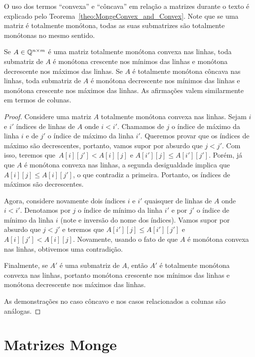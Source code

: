 O uso dos termos ``convexa'' e ``côncava'' em relação a matrizes durante o texto é explicado pelo Teorema~\ref{theo:MongeConvex_and_Convex}. Note que se uma matriz é totalmente monótona, todas as suas submatrizes são totalmente monótonas no mesmo sentido.

\begin{lema} \label{lema:MonotoneTotallyMonotone}
Se $A \in \mathbb{Q}^{n \times m}$ é uma matriz totalmente monótona convexa nas linhas, toda submatriz de $A$ é monótona crescente nos mínimos das linhas e monótona decrescente nos máximos das linhas. Se $A$ é totalmente monótona côncava nas linhas, toda submatriz de $A$ é monótona decrescente nos mínimos das linhas e monótona crescente nos máximos das linhas. As afirmações valem similarmente em termos de colunas.
\end{lema}

\begin{proof}
Considere uma matriz $A$ totalmente monótona convexa nas linhas. Sejam $i$ e $i'$ índices de linhas de $A$ onde $i < i'$. Chamamos de $j$ o índice de máximo da linha $i$ e de $j'$ o índice de máximo da linha $i'$. Queremos provar que os índices de máximo são decrescentes, portanto, vamos supor por absurdo que $j < j'$. Com isso, teremos que~${ A[i][j'] < A[i][j] }$ e $A[i'][j] \leq A[i'][j']$. Porém, já que $A$ é monótona convexa nas linhas, a segunda desigualdade implica que $A[i][j] \leq A[i][j']$, o que contradiz a primeira. Portanto, os índices de máximos são decrescentes.  

Agora, considere novamente dois índices $i$ e $i'$ quaisquer de linhas de $A$ onde $i < i'$. Denotamos por $j$ o índice de mínimo da linha $i'$ e por $j'$ o índice de mínimo da linha $i$ (note e inversão do nome dos índices). Vamos supor por absurdo que $j < j'$ e teremos que $A[i'][j] \leq A[i'][j']$ e $A[i][j'] < A[i][j]$. Novamente, usando o fato de que $A$ é monótona convexa nas linhas, obtivemos uma contradição.  

Finalmente, se $A'$ é uma submatriz de $A$, então $A'$ é totalmente monótona convexa nas linhas, portanto monótona crescente nos mínimos das linhas e monótona decrescente nos máximos das linhas.

As demonstrações no caso côncavo e nos casos relacionados a colunas são análogas.
\end{proof}

\section{Matrizes Monge} \label{Monge:Monge}

